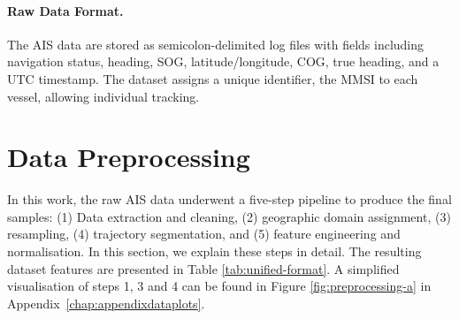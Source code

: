 \paragraph{Raw Data Format.}

The \ac{AIS} data are stored as semicolon-delimited log files with fields including navigation status, heading, \ac{SOG}, latitude/longitude, \ac{COG}, true heading, and a UTC timestamp. %
The dataset assigns a unique identifier, the \ac{MMSI} to each vessel, allowing individual tracking.

\section{Data Preprocessing}
\label{sec:data_preprocessing}

In this work, the raw \ac{AIS} data underwent 
a five-step pipeline to produce the final samples: (1) Data extraction and cleaning, (2) geographic domain assignment, (3) resampling, (4) trajectory segmentation, and (5) feature engineering and normalisation.
In this section, we explain these steps in detail. The resulting dataset features are presented in Table \ref{tab:unified-format}. A simplified visualisation of steps 1, 3 and 4 can be found in Figure \ref{fig:preprocessing-a} in Appendix~\ref{chap:appendixdataplots}.

